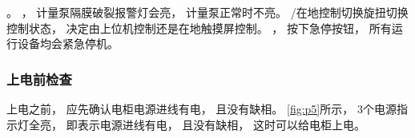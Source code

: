 \documentclass[UTF8,a4paper,12pt,titlepage]{ctexart}
\begin{document}
        。
        ，
        计量泵隔膜破裂报警灯会亮，
        计量泵正常时不亮。
        /在地控制切换旋扭切换控制状态，
        决定由上位机控制还是在地触摸屏控制。
        ，
        按下急停按钮，
        所有运行设备均会紧急停机。

      \subsubsection{上电前检查}
         上电之前，
         应先确认电柜电源进线有电，
         且没有缺相。
      \ref{fig:p5}所示，
      3个电源指示灯全亮，
      即表示电源进线有电，
      且没有缺相，
      这时可以给电柜上电。

      \newpage %
\end{document}
